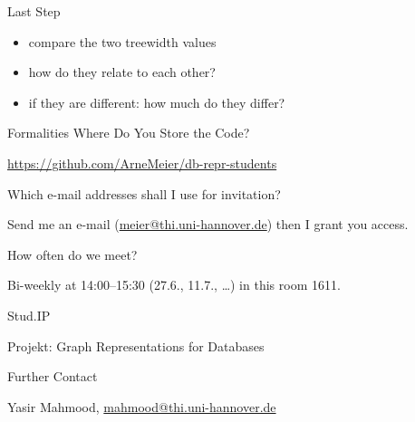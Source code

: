 \documentclass[aspectratio=169]{beamer}
\begin{document}
\begin{frame}{Last Step}
\begin{itemize}
	\item compare the two treewidth values
	\item how do they relate to each other?
	\item if they are different: how much do they differ?
\end{itemize}
\end{frame}



\begin{frame}{Formalities}
\alert{Where Do You Store the Code?}

\url{https://github.com/ArneMeier/db-repr-students}\bigskip

\alert{Which e-mail addresses shall I use for invitation?}

Send me an e-mail (\url{meier@thi.uni-hannover.de}) then I grant you access. \bigskip

\alert{How often do we meet?} 

Bi-weekly at 14:00--15:30 (27.6., 11.7., \dots) in this room 1611.\bigskip

\alert{Stud.IP}

Projekt: Graph Representations for Databases\bigskip

\alert{Further Contact}

Yasir Mahmood, \url{mahmood@thi.uni-hannover.de}


\end{frame}
\end{document}
